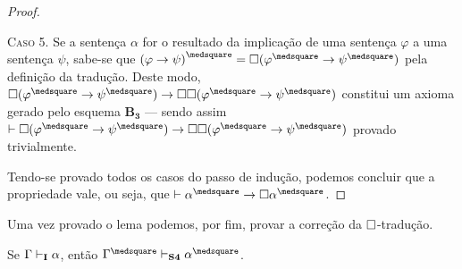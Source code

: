 \begin{lemma}
\begin{proof}
            \begin{case}
                \textsc{Caso 5.}
                Se a sentença $\alpha$ for o resultado da implicação de uma sentença $\varphi$ a uma sentença $\psi$, sabe-se que ${(\varphi\to\psi)}^\medsquare=\nec(\varphi^\medsquare\to\psi^\medsquare)$ pela definição da tradução.
                Deste modo, $\nec(\varphi^\medsquare\to\psi^\medsquare)\to\nec\nec(\varphi^\medsquare\to\psi^\medsquare)$ constitui um axioma gerado pelo esquema \hyperref[MB3]{$\mathbf{B_3}$} --- sendo assim $\entails\nec(\varphi^\medsquare\to\psi^\medsquare)\to\nec\nec(\varphi^\medsquare\to\psi^\medsquare)$ provado trivialmente.
            \end{case}
            \vspace{.5\baselineskip}
            Tendo-se provado todos os casos do passo de indução, podemos concluir que a propriedade vale, ou seja, que $\entails\alpha^\medsquare\to\nec\alpha^\medsquare$.
        \end{proof}
    \end{lemma}

    Uma vez provado o lema podemos, por fim, provar a correção da $\Box$-tradução.

    \begin{theorem}\label{square-correctness}
        Se $\Gamma\mathrel{\vdash}_\mathbf{I}\alpha$, então $\Gamma^\medsquare\entails_\mathbf{S4}\alpha^\medsquare$.
    \end{theorem}

